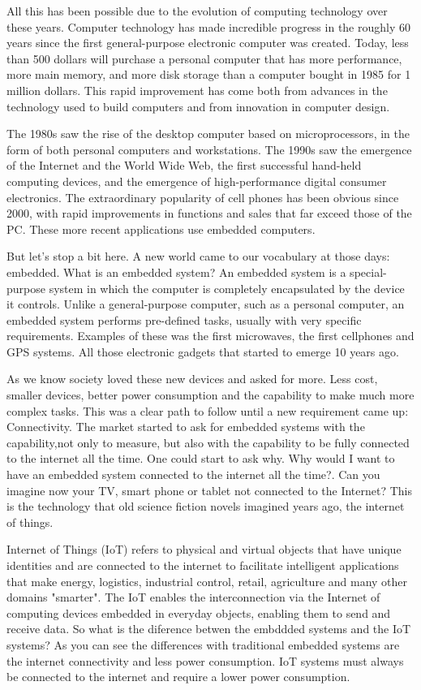 All this has been possible due to the evolution of computing technology over
these years. Computer technology has made incredible progress in the roughly 60
years since the first general-purpose electronic computer was created. Today,
less than 500 dollars  will purchase a personal computer that has more
performance, more main memory, and more disk storage than a computer bought in
1985 for 1 million dollars.\cite{Hennessy} This rapid improvement has come both
from advances in the technology used to build computers and from innovation in
computer design.

The 1980s saw the rise of the desktop computer based on microprocessors, in the
form of both personal computers and workstations. The 1990s saw the emergence
of the Internet and the World Wide Web, the first successful hand-held computing
devices, and the emergence of high-performance digital consumer electronics.
The extraordinary popularity of cell phones has been obvious since 2000, with
rapid improvements in functions and sales that far exceed those of the PC.
These more recent applications use embedded computers.

But let's stop a bit here. A new world came to our vocabulary at those days:
embedded. What is an embedded system? An embedded system is a special-purpose
system in which the computer is completely encapsulated by the device it
controls.\cite{Hallinan} Unlike a general-purpose computer, such as a personal
computer, an embedded system performs pre-defined tasks, usually with very
specific requirements. Examples of these was the first microwaves, the first
cellphones and GPS systems. All those electronic gadgets that started to emerge
10 years ago.

As we know society loved these new devices and asked for more. Less cost,
smaller devices, better power consumption and the capability to make much more
complex tasks. This was a clear path to follow until a new requirement came up:
Connectivity. The market started to ask for embedded systems with the
capability,not only to measure, but also with the capability to be fully
connected to the internet all the time. One could start to ask why. Why would I
want to have an embedded system connected to the internet all the time?. Can
you imagine now your TV, smart phone or tablet not connected to the Internet?
This is the technology that old science fiction novels imagined years ago, the
internet of things.

Internet of Things (IoT) refers to physical and virtual objects that have
unique identities and are connected to the internet to facilitate intelligent
applications that make energy, logistics, industrial control, retail,
agriculture and many other domains "smarter".\cite{Bahga} The IoT enables the
interconnection via the Internet of computing devices embedded in everyday
objects, enabling them to send and receive data. So what is the diference
betwen the embddded systems and the IoT systems? As you can see the differences
with traditional embedded systems are the internet connectivity and less power
consumption. IoT systems must always be connected to the internet and require a
lower power consumption.

